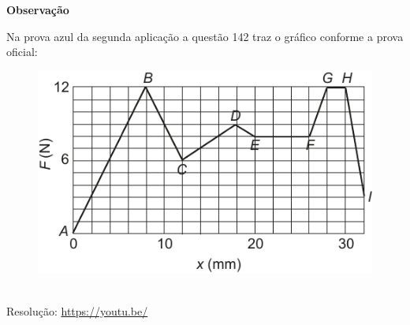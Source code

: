 \textbf{Observação}

Na prova azul da segunda aplicação a questão 142 traz o gráfico conforme a prova oficial:

\begin{figure}[H]
    \centering
    \includegraphics[width=0.99\linewidth]{Q142-R}
    \caption{}
    \label{fig:q142-r}
\end{figure}


\begin{center}
    \href{https://youtu.be/}{
    }\\
    Resolução: \url{https://youtu.be/}
\end{center}
